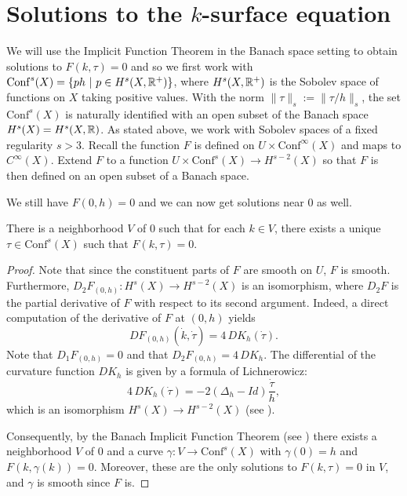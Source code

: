 \section{Solutions to the $k$-surface equation}
\label{k-surface-solutions}

We will use the Implicit Function Theorem in the Banach space setting to obtain solutions to $F(k,\tau) = 0$ and so we first work with $\mathrm{Conf}^s(X) = \{ p h \ |\ p \in H^s(X,\mathbb{R}^+)\}$, where $H^s(X,\mathbb{R}^+)$ is the Sobolev space of functions on $X$ taking positive values.
With the norm $\|\tau\|_s := \| \tau/h\|_s$, the set $\mathrm{Conf}^s(X)$ is naturally identified with an open subset of the Banach space $H^s(X) = H^{s}(X,\mathbb{R})$.
As stated above, we work with Sobolev spaces of a fixed regularity $s > 3$.
Recall the function $F$ is defined on $U \times \mathrm{Conf}^\infty(X)$ and maps to $C^\infty(X)$. 
Extend $F$ to a function $U \times \mathrm{Conf}^s(X) \to H^{s-2}(X)$ so that $F$ is then defined on an open subset of a Banach space. 

We still have $F(0,h) = 0$ and we can now get solutions near $0$ as well.



\begin{thm}
\label{weak-solutions}
There is a neighborhood $V$ of $0$ such that for each $k \in V$, there exists a unique $\tau \in \mathrm{Conf}^s(X)$ such that $F(k,\tau) = 0$.
\end{thm}

\begin{proof} 
Note that since the constituent parts of $F$ are smooth on $U$, $F$ is smooth. 
Furthermore, $D_2F_{(0,h)} : H^s(X) \to H^{s-2}(X)$ is an isomorphism, where $D_2F$ is the partial derivative of $F$ with respect to its second argument. 
Indeed, a direct computation of the derivative of $F$ at $(0,h)$ yields 
\[
DF_{(0,h)}(\dot{k},\dot{\tau}) = 4 \, D K_h(\dot{\tau}).
\]
Note that $D_1F_{(0,h)} = 0$ and that $D_2F_{(0,h)} = 4 \, DK_h$. 
The differential of the curvature function $D K_h$ is given by a formula of Lichnerowicz: 
\[
 4\, DK_h(\dot{\tau}) = -2(\Delta_h - Id)\frac{\dot{\tau}}{h},
\]
which is an isomorphism $H^s(X) \to H^{s-2}(X)$ (see \cite[Page 33]{tromba1992}).

Consequently, by the Banach Implicit Function Theorem (see \cite[Theorem 17.6]{gilbarg-trudinger2001}) there exists a neighborhood $V$ of $0$ and a curve $\gamma : V \to \mathrm{Conf}^s(X)$ with $\gamma(0) = h$ and $F(k, \gamma(k)) = 0$. 
Moreover, these are the only solutions to $F(k,\tau) = 0$ in $V$, and $\gamma$ is smooth since $F$ is.
\end{proof}